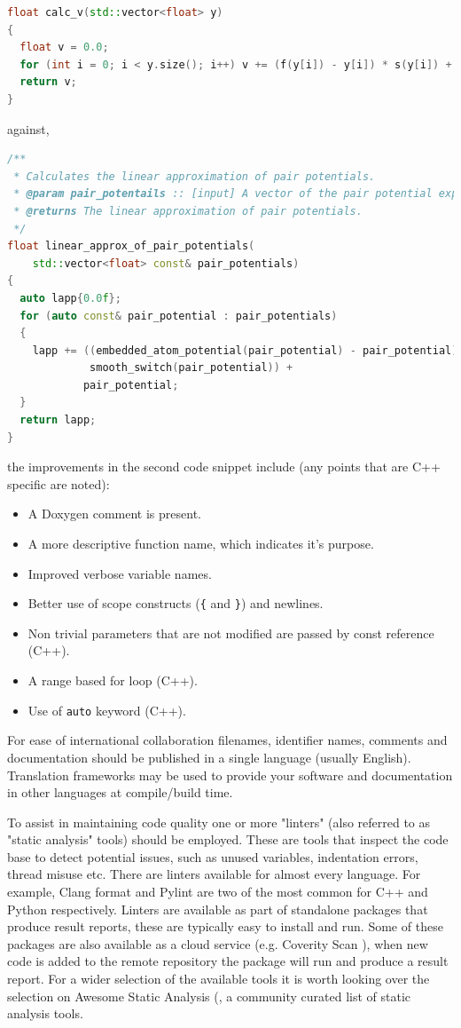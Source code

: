 \documentclass[jnr]{iosart2x}
\begin{document}
\begin{lstlisting}[frame=single, language=C++]
float calc_v(std::vector<float> y)
{
  float v = 0.0;
  for (int i = 0; i < y.size(); i++) v += (f(y[i]) - y[i]) * s(y[i]) + y[i];
  return v;
}
\end{lstlisting}
against,
\begin{lstlisting}[frame=single, language=C++]
/**
 * Calculates the linear approximation of pair potentials.
 * @param pair_potentails :: [input] A vector of the pair potential experienced by each atom.
 * @returns The linear approximation of pair potentials.
 */
float linear_approx_of_pair_potentials(
    std::vector<float> const& pair_potentials)
{
  auto lapp{0.0f};
  for (auto const& pair_potential : pair_potentials)
  {
    lapp += ((embedded_atom_potential(pair_potential) - pair_potential) *
             smooth_switch(pair_potential)) +
            pair_potential;
  }
  return lapp;
}
\end{lstlisting}

the improvements in the second code snippet include (any points that are C++ specific are noted):
\begin{itemize}
  \item{A Doxygen \cite{doxygen} comment is present.}
  \item{A more descriptive function name, which indicates it's purpose.}
  \item{Improved verbose variable names.}
  \item{Better use of scope constructs (\texttt{\{} and \texttt{\}}) and newlines.}
  \item{Non trivial parameters that are not modified are passed by const reference (C++).}
  \item{A range based for loop (C++).}
  \item{Use of \texttt{auto} keyword (C++).}
\end{itemize}

For ease of international collaboration filenames, identifier names, comments and documentation should be published in a single language (usually English).
Translation frameworks may be used to provide your software and documentation in other languages at compile/build time.

To assist in maintaining code quality one or more "linters" (also referred to as "static analysis" tools) should be employed.
These are tools that inspect the code base to detect potential issues, such as unused variables, indentation errors, thread misuse etc.
There are linters available for almost every language.
For example, Clang format \cite{Clang} and Pylint \cite{Pylint} are two of the most common for C++ and Python respectively.
Linters are available as part of standalone packages that produce result reports, these are typically easy to install and run.
Some of these packages are also available as a cloud service (e.g. Coverity Scan \cite{coverity}), when new code is added to the remote repository the package will run and produce a result report.
For a wider selection of the available tools it is worth looking over the selection on Awesome Static Analysis (\cite{awesome_static_analysis}, a community curated list of static analysis tools.
\end{document}
